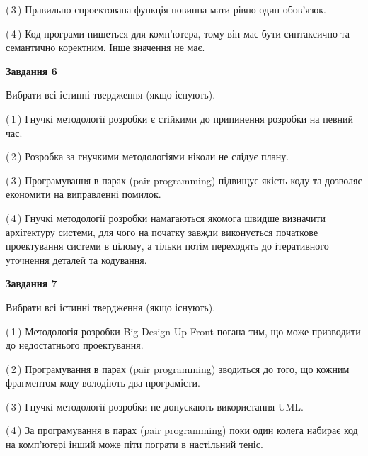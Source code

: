 \documentclass[10pt, ukrainian]{article}
\begin{document}
{\begin {large}
(\,3\,) Правильно спроектована функція повинна мати рівно один обов'язок. %



(\,4\,) Код програми пишеться для комп'ютера, тому він має бути синтаксично та семантично коректним. Інше значення не має. %

\newpage

{\begin {center}\textbf{Завдання 6}\end {center}}\par
Вибрати всі істинні твердження (якщо існують).\par
\vspace{2mm}



(\,1\,) Гнучкі методології розробки є стійкими до припинення розробки на певний час. %



(\,2\,) Розробка за гнучкими методологіями ніколи не слідує плану. %



(\,3\,) Програмування в парах (pair programming) підвищує якість коду та дозволяє економити на виправленні помилок. %



(\,4\,) Гнучкі методології розробки намагаються якомога швидше визначити архітектуру системи, для чого на початку завжди виконується початкове проектування системи в цілому, а тільки потім переходять до ітеративного уточнення деталей та кодування. %


{\begin {center}\textbf{Завдання 7}\end {center}}\par
Вибрати всі істинні твердження (якщо існують).\par
\vspace{2mm}



(\,1\,) Методологія розробки Big Design Up Front погана тим, що може призводити до недостатнього проектування.%



(\,2\,) Програмування в парах (pair programming) зводиться до того, що кожним фрагментом коду володіють два програмісти. %



(\,3\,) Гнучкі методології розробки не допускають використання UML. %



(\,4\,) За програмування в парах (pair programming) поки один колега набирає код на комп'ютері інший може піти пограти в настільний теніс. %



\end{large}}
\end{document}
